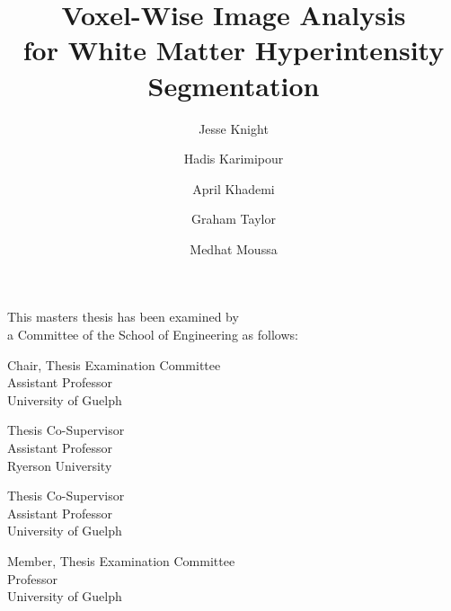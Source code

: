 \title{Voxel-Wise Image Analysis\\for White Matter Hyperintensity Segmentation}
\author{Jesse Knight}
\degreemonth{}
\copyrightnoticetext{}
\maketitle
\cleardoublepage{}
\setcounter{page}{1}
\begin{abstractpage}
  
\end{abstractpage}
\cleardoublepage{}
\begin{titlepage}
  \begin{large}
    This masters thesis has been examined by \\ a Committee of the School of Engineering as follows:
    \signature{Hadis Karimipour}{Chair, Thesis Examination Committee \\
      Assistant Professor\\
      University of Guelph}
    \signature{April Khademi}{Thesis Co-Supervisor \\
      Assistant Professor\\
      Ryerson University}
    \signature{Graham Taylor}{Thesis Co-Supervisor \\
      Assistant Professor\\
      University of Guelph}
    \signature{Medhat Moussa}{Member, Thesis Examination Committee \\
      Professor\\
      University of Guelph}
  \end{large}
\end{titlepage}
